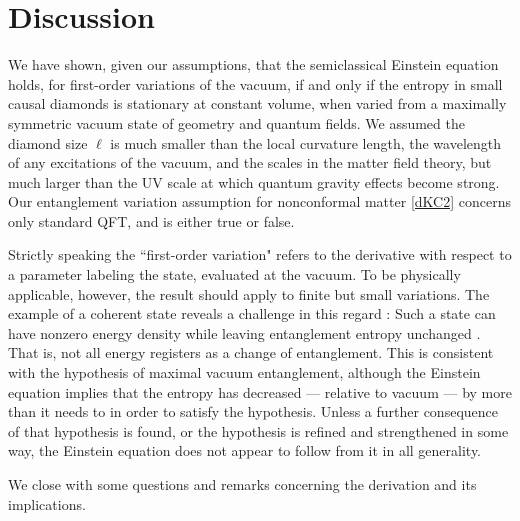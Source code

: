 \documentclass[aps,prd,showpacs,groupedaddress,nofootinbib,longbibliography,12pt]{revtex4-1}
\def\la{\langle}
\def\ra{\rangle}
\begin{document}
\section{Discussion}

We have shown, given our assumptions, that the semiclassical Einstein equation 
holds, 
for first-order  variations of the vacuum, 
if and only if the entropy in small causal diamonds is stationary at constant volume, when varied from a maximally symmetric vacuum state of geometry and quantum fields. 
We assumed the diamond size $\ell$ is much smaller than the local curvature length, 
the wavelength of any excitations of the vacuum, and
the scales in the matter field theory, but much larger than the UV scale at which quantum gravity effects become strong.
Our entanglement variation assumption for nonconformal matter \eqref{dKC2} 
concerns only standard QFT, and is either true or false. 

Strictly speaking the ``first-order  variation" refers to the derivative with respect to a parameter labeling the state, evaluated at the vacuum. To be physically applicable, however, the result should apply to finite but small variations. The example of a coherent state reveals a challenge in this regard \cite{Madhavan}: Such a state can have nonzero energy density while leaving entanglement entropy unchanged \cite{Fiola:1994ir, Benedict:1995yp}. That is, not all energy registers as a change of entanglement. This is consistent with the hypothesis of maximal vacuum entanglement, although the Einstein equation implies that the entropy has decreased --- relative to vacuum --- by more than it needs to in order to satisfy the hypothesis. Unless a further consequence of that hypothesis is found, or the hypothesis is refined and strengthened in some way, the Einstein equation does not appear to follow from it in all generality.

We close with some questions and remarks concerning the derivation and its implications.
\end{document}
